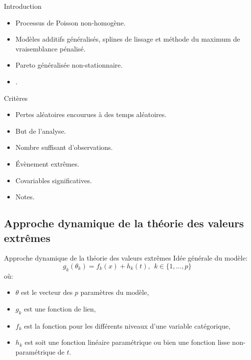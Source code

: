 \documentclass[aspectratio=169, 12pt, french]{beamer}
\begin{document}
\begin{frame}{Introduction}
\begin{itemize}
\item Processus de Poisson non-homogène. \pause
\item Modèles additifs généralisés, splines de lissage et méthode du maximum de vraisemblance pénalisé. \pause
\item Pareto généralisée non-stationnaire. \pause
\item \cite{coles2001introduction}.
\end{itemize}
\end{frame}

\begin{frame}{Critères}
\begin{itemize}
\item Pertes aléatoires encourues à des temps aléatoires. \pause
\item But de l'analyse. \pause
\item Nombre suffisant d'observations. \pause
\item Évènement extrêmes. \pause
\item Covariables significatives. \pause
\item Notes.
\end{itemize}
\end{frame}

\subsection{Approche dynamique de la théorie des valeurs extrêmes}
\begin{frame}{Approche dynamique de la théorie des valeurs extrêmes}
Idée générale du modèle:
\begin{equation*}
g_k(\theta_k) = f_k(x) + h_k(t), \ \ k \in \{1, \dots, p \}
\end{equation*}
où:
\begin{itemize}
\item $\theta$ est le vecteur des $p$ paramètres du modèle,\pause
\item $g_k$ est une fonction de lien, \pause
\item $f_k$ est la fonction pour les différents niveaux d'une variable catégorique, \pause
\item $h_k$ est soit une fonction linéaire paramétrique ou bien une fonction lisse non-paramétrique de $t$.
\end{itemize}
\end{frame}
\end{document}
